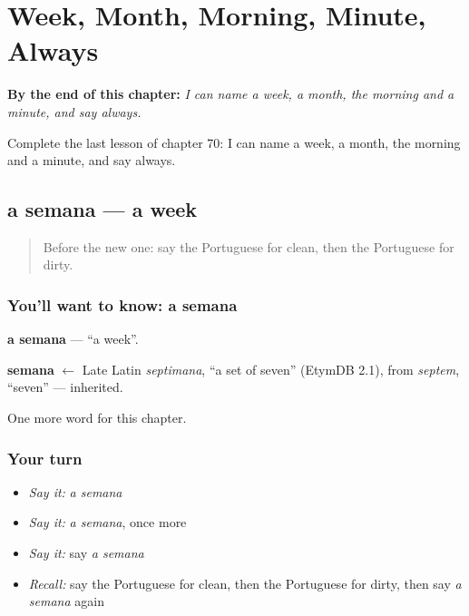 
\chapter{Week, Month, Morning, Minute, Always}
\label{ch:pt-week-month-morning-minute-always}

\begin{chapteropening}
\textbf{By the end of this chapter:} \emph{I can name a week, a month, the morning and a minute, and say always.}

Complete the last lesson of chapter 70: I can name a week, a month, the morning and a minute, and say always.
\end{chapteropening}

\section[a semana]{a semana — a week}

\label{lesson:PT-C70-semana}



\begin{quote}
Before the new one: say the Portuguese for clean, then the Portuguese for dirty.
\end{quote}

\subsection*{You'll want to know: a semana}
\textbf{a semana} — \textquotedblleft{}a week\textquotedblright{}.

\begin{cousinweb}
\textbf{semana} $\leftarrow$ Late Latin \emph{septimana}, \textquotedblleft{}a set of seven\textquotedblright{} (EtymDB 2.1), from \emph{septem}, \textquotedblleft{}seven\textquotedblright{} — inherited.
\end{cousinweb}

\begin{grammarlens}[title={What you've built}]
One more word for this chapter.
\end{grammarlens}

\subsection*{Your turn}
\begin{itemize}
\raggedright
  \item \emph{Say it:} \emph{a semana}
  \item \emph{Say it:} \emph{a semana}, once more
  \item \emph{Say it:} say \emph{a semana}
  \item \emph{Recall:} say the Portuguese for clean, then the Portuguese for dirty, then say \emph{a semana} again
\end{itemize}

